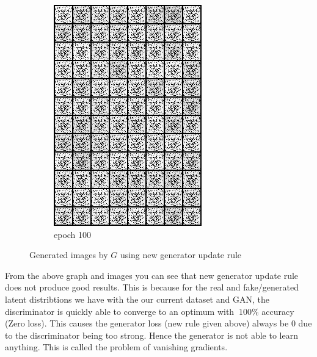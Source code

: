 \documentclass[a4paper]{article}
\theoremstyle{definition}
\newenvironment{soln}{
	\leavevmode\color{blue}\ignorespaces
}{}
\begin{document}
\begin{enumerate} [label=(\alph*)]
\begin{soln}
\begin{figure}[H]
\begin{subfigure}[b]{0.3\textwidth}
					\includegraphics[width=\textwidth]{../outputs/gen_img100.png}
					\caption{epoch 100}
				\end{subfigure}
				\caption{Generated images by $G$ using new generator update rule}
				\label{fig:three graphs}
			\end{figure}

			From the above graph and images you can see that new generator update rule does not produce good results. This is because for the real and fake/generated latent distribtions we have with the our current dataset and GAN, the discriminator is quickly able to converge to an optimum with $~100\%$ accuracy (Zero loss). This causes the generator loss (new rule given above) always be $0$ due to the discriminator being too strong. Hence the generator is not able to learn anything. This is called the problem of vanishing gradients.
		\end{soln}
		

\end{enumerate}
\end{document}
